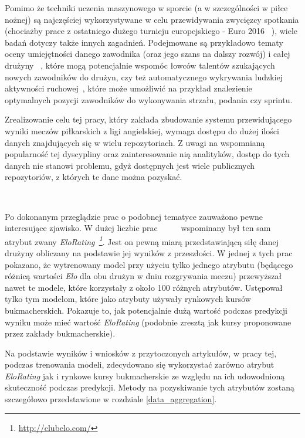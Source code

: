 Pomimo że techniki uczenia maszynowego w sporcie (a w szczególności w piłce nożnej) są najczęściej wykorzystywane w celu przewidywania zwycięzcy spotkania (chociażby prace z ostatniego dużego turnieju europejskiego - Euro 2016~\cite{Euro2016-1} \cite{Euro2016-2} \cite{Euro2016-3}), wiele badań dotyczy także innych zagadnień. Podejmowane są przykładowo tematy oceny umiejętności danego zawodnika (oraz jego szans na dalszy rozwój) i całej drużyny~\cite{ml_soccer_analytics} \cite{soccer_players_skill}, które mogą potencjalnie wspomóc łowców talentów szukających nowych zawodników do drużyn, czy też automatycznego wykrywania ludzkiej aktywności ruchowej~\cite{activity_recignition}, które może umożliwić na przykład znalezienie optymalnych pozycji zawodników do wykonywania strzału, podania czy sprintu.

Zrealizowanie celu tej pracy, który zakłada zbudowanie systemu przewidującego wyniki meczów piłkarskich z ligi angielskiej, wymaga dostępu do dużej ilości danych znajdujących się w wielu repozytoriach. Z uwagi na wspomnianą popularność tej dyscypliny oraz zainteresowanie nią analityków, dostęp do tych danych nie stanowi problemu, gdyż dostępnych jest wiele publicznych repozytoriów, z których te dane można pozyskać.

~

Po dokonanym przeglądzie prac o podobnej tematyce zauważono pewne interesujące zjawisko. W dużej liczbie prac~\cite{WorldCup-2018}~\cite{EloRating-1}~\cite{Euro2016-1}~\cite{Euro2016-2}~\cite{Euro2016-3} wspominany był ten sam atrybut zwany \emph{EloRating~\footnote{\url{http://clubelo.com/}}}. Jest on pewną miarą przedstawiającą siłę danej drużyny obliczany na podstawie jej wyników z przeszłości. W jednej z tych prac~\cite{EloRating-1} pokazano, że wytrenowany model przy użyciu tylko jednego atrybutu (będącego różnicą wartości \emph{Elo} dla obu drużyn w dniu rozgrywania meczu) przewyższał nawet te modele, które korzystały z około 100 różnych atrybutów. Ustępował tylko tym modelom, które jako atrybuty używały rynkowych kursów bukmacherskich. Pokazuje to, jak potencjalnie dużą wartość podczas predykcji wyniku może mieć wartość \emph{EloRating} (podobnie zresztą jak kursy proponowane przez zakłady bukmacherskie).

Na podstawie wyników i wniosków z przytoczonych artykułów, w pracy tej, podczas trenowania modeli, zdecydowano się wykorzystać zarówno atrybut \emph{EloRating} jak i rynkowe kursy bukmacherskie ze względu na ich udowodnioną skuteczność podczas predykcji. Metody na pozyskiwanie tych atrybutów zostaną szczegółowo przedstawione w rozdziale \ref{data_aggregation}.

